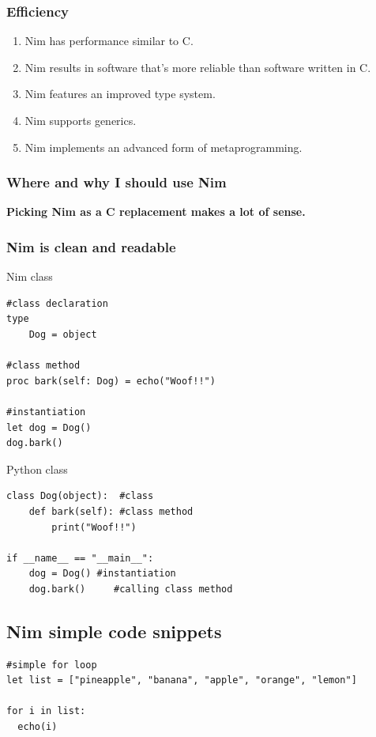 \documentclass[10pt, a4paper, twocolumn]{article} %
\begin{document}
\subsubsection{Efficiency} 
\begin{enumerate}
	\item Nim has performance similar to C.
	\item Nim results in software that’s more reliable than software written in C. 
	\item Nim features an improved type system.
	\item Nim supports generics.
	\item Nim implements an advanced form of metaprogramming.
\end{enumerate}

\subsubsection{Where and why I should use Nim} 
\textbf{Picking Nim as a C replacement makes a lot of sense.}

\subsubsection{Nim is clean and readable}

Nim class
\begin{lstlisting}
#class declaration
type
    Dog = object

#class method
proc bark(self: Dog) = echo("Woof!!")

#instantiation
let dog = Dog()
dog.bark()
\end{lstlisting}

Python class 

\begin{lstlisting}
class Dog(object):	#class
    def bark(self):	#class method
        print("Woof!!")

if __name__ == "__main__":
    dog = Dog()	#instantiation
    dog.bark()	   #calling class method

\end{lstlisting}
\newpage
\subsection{Nim simple code snippets}
\begin{lstlisting}
#simple for loop
let list = ["pineapple", "banana", "apple", "orange", "lemon"]

for i in list:
  echo(i)
\end{lstlisting}
\end{document}
